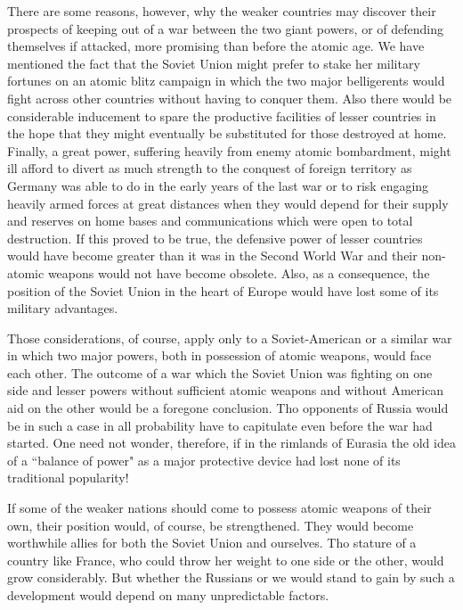 There are some reasons, however, why the weaker countries may discover their prospects of keeping out of a war between the two giant powers, or of defending themselves if attacked, more promising than before the atomic age. We have mentioned the fact that the Soviet Union might prefer to stake her military fortunes on an atomic blitz campaign in which the two major belligerents would fight across other countries without having to conquer them. Also there would be considerable inducement to spare the productive facilities of lesser countries in the hope that they might eventually be substituted for those destroyed at home. Finally, a great power, suffering heavily from enemy atomic bombardment, might ill afford to divert as much strength to the conquest of foreign territory as Germany was able to do in the early years of the last war or to risk engaging heavily armed forces at great distances when they would depend for their supply and reserves on home bases and communications which were open to total destruction. If this proved to be true, the defensive power of lesser countries would have become greater than it was in the Second World War and their non-atomic weapons would not have become obsolete. Also, as a consequence, the position of the Soviet Union in the heart of Europe would have lost some of its military advantages.

Those considerations, of course, apply only to a Soviet-American or a similar war in which two major powers, both in possession of atomic weapons, would face each other. The outcome of a war which the Soviet Union was fighting on one side and lesser powers without sufficient atomic weapons and without American aid on the other would be a foregone conclusion. Tho opponents of Russia would be in such a case in all probability have to capitulate even before the war had started. One need not wonder, therefore, if in the rimlands of Eurasia the old idea of a ``balance of power" as a major protective device had lost none of its traditional popularity!

If some of the weaker nations should come to possess atomic weapons of their own, their position would, of course, be strengthened. They would become worthwhile allies for both the Soviet Union and ourselves. Tho stature of a country like France, who could throw her weight to one side or the other, would grow considerably. But whether the Russians or we would stand to gain by such a development would depend on many unpredictable factors.

